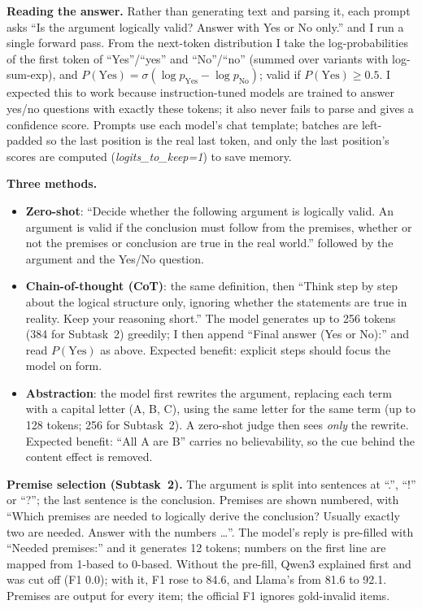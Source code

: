 \documentclass[11pt,letterpaper]{article}
\begin{document}
\textbf{Reading the answer.} Rather than generating text and parsing it, each prompt asks ``Is the argument logically valid? Answer with Yes or No only.'' and I run a single forward pass. From the next-token distribution I take the log-probabilities of the first token of ``Yes''/``yes'' and ``No''/``no'' (summed over variants with log-sum-exp), and $P(\text{Yes}) = \sigma(\log p_\text{Yes} - \log p_\text{No})$; valid if $P(\text{Yes}) \ge 0.5$. I expected this to work because instruction-tuned models are trained to answer yes/no questions with exactly these tokens; it also never fails to parse and gives a confidence score. Prompts use each model's chat template; batches are left-padded so the last position is the real last token, and only the last position's scores are computed (\textit{logits\_to\_keep=1}) to save memory.

\textbf{Three methods.}
\begin{itemize}
  \item \textbf{Zero-shot}: ``Decide whether the following argument is logically valid. An argument is valid if the conclusion must follow from the premises, whether or not the premises or conclusion are true in the real world.'' followed by the argument and the Yes/No question.
  \item \textbf{Chain-of-thought (CoT)}: the same definition, then ``Think step by step about the logical structure only, ignoring whether the statements are true in reality. Keep your reasoning short.'' The model generates up to 256 tokens (384 for Subtask~2) greedily; I then append ``Final answer (Yes or No):'' and read $P(\text{Yes})$ as above. Expected benefit: explicit steps should focus the model on form.
  \item \textbf{Abstraction}: the model first rewrites the argument, replacing each term with a capital letter (A, B, C), using the same letter for the same term (up to 128 tokens; 256 for Subtask~2). A zero-shot judge then sees \emph{only} the rewrite. Expected benefit: ``All A are B'' carries no believability, so the cue behind the content effect is removed.
\end{itemize}
\textbf{Premise selection (Subtask~2).} The argument is split into sentences at ``.'', ``!'' or ``?''; the last sentence is the conclusion. Premises are shown numbered, with ``Which premises are needed to logically derive the conclusion? Usually exactly two are needed. Answer with the numbers \dots''. The model's reply is pre-filled with ``Needed premises:'' and it generates 12 tokens; numbers on the first line are mapped from 1-based to 0-based. Without the pre-fill, Qwen3 explained first and was cut off (F1 0.0); with it, F1 rose to 84.6, and Llama's from 81.6 to 92.1. Premises are output for every item; the official F1 ignores gold-invalid items.
\end{document}
